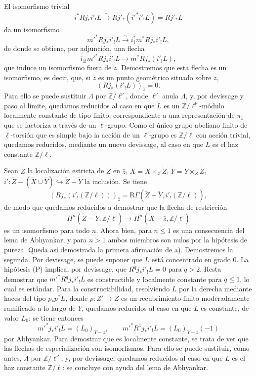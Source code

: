 El isomorfismo trivial
\[
i^*Rj_*i'_!L\xrightarrow{\sim}Rj'_*(i'^*i'_!L)=Rj'_*L
\]
da un isomorfismo
\[
m'^*Rj_*i'_!L\xrightarrow{\sim} i_1^*m^*Rj_*i'_!L,
\]
de donde se obtiene, por adjunción, una flecha
\[
i_{1!}m'^*Rj_*i'_!L\longrightarrow m^*Rj_*(i'_!L),
\]
que induce un isomorfismo fuera de $z$. Demostremos que esta flecha es un isomorfismo, es decir, que, si $\bar z$ es un punto geométrico situado sobre $z$,
\[
(Rj_*(i'_!L))_{\bar z}=0.
\]
Para ello se puede sustituir $\Lambda$ por $\mathbb Z/\ell^\nu$, donde $\ell^\nu$ anula $\Lambda$, y, por devissage y paso al límite, quedamos reducidos al caso en que $L$ es un $\mathbb Z/\ell^\nu$-módulo localmente constante de tipo finito, correspondiente a una representación de $\pi_1$ que se factoriza a través de un $\ell$-grupo. Como el único grupo abeliano finito de $\ell$-torsión que es simple bajo la acción de un $\ell$-grupo es $\mathbb Z/\ell$ con acción trivial, quedamos reducidos, mediante un nuevo devissage, al caso en que $L$ es el haz constante $\mathbb Z/\ell$.

Sean $\widetilde Z$ la localización estricta de $Z$ en $\bar z$, $\widetilde X=X\times_Z\widetilde Z$, $\widetilde Y=Y\times_Z\widetilde Z$, $i':\widetilde Z-(\widetilde X\cup\widetilde Y)\hookrightarrow \widetilde Z-\widetilde Y$ la inclusión. Se tiene
\[
(Rj_*(i'_!(\mathbb Z/\ell)))_{\bar z}
=\mathrm R\Gamma(\widetilde Z-\widetilde Y,i'_!(\mathbb Z/\ell)),
\]
de modo que quedamos reducidos a demostrar que la flecha de restricción
\[
H^n(\widetilde Z-\widetilde Y,\mathbb Z/\ell)
\longrightarrow
H^n(\widetilde X-\bar z,\mathbb Z/\ell)
\]
es un isomorfismo para todo $n$. Ahora bien, para $n\le1$ es una consecuencia del lema de Abhyankar, y para $n>1$ ambos miembros son nulos por la hipótesis de pureza. Queda así demostrada la primera afirmación de a). Demostremos la segunda. Por devissage, se puede suponer que $L$ está concentrado en grado $0$. La hipótesis (P) implica, por devissage, que $R^qj_*i'_!L=0$ para $q>2$. Resta demostrar que $m'^*R^qj_*i'_!L$ es constructible y localmente constante para $q\le1$, lo cual es estándar. Para la constructibilidad, resolviendo $L$ por la derecha mediante haces del tipo $p_*p^*L$, donde $p:Z'\to Z$ es un recubrimiento finito moderadamente ramificado a lo largo de $Y$, quedamos reducidos al caso en que $L$ es constante, de valor $L_0$: se tiene entonces
\[
m'^*j_*i'_!L=(L_0)_{Y-z},
\qquad
m'^*R^1j_*i'_!L=(L_0)_{Y-z}(-1)
\]
por Abhyankar. Para demostrar que es localmente constante, se trata de ver que las flechas de especialización son isomorfismos. Para ello se puede sustituir, como antes, $\Lambda$ por $\mathbb Z/\ell^\nu$, y, por devissage, quedamos reducidos al caso en que $L$ es el haz constante $\mathbb Z/\ell$: se concluye con ayuda del lema de Abhyankar.
